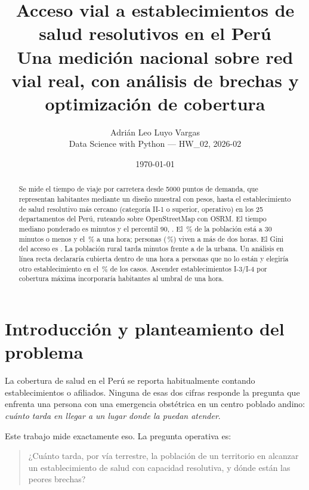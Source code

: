 \documentclass[10pt,a4paper]{article}
\title{\bfseries Acceso vial a establecimientos de salud resolutivos en el
Perú\\[0.35em]\large Una medición nacional sobre red vial real, con análisis de
brechas y optimización de cobertura}
\author{Adrián Leo Luyo Vargas\\\small Data Science with Python — HW\_02, 2026-02}
\date{\today}
\begin{document}
\maketitle

\begin{abstract}
\noindent
Se mide el tiempo de viaje por carretera desde \num{5000} puntos de demanda, que
representan \kpiPoblacionTotal{} habitantes mediante un diseño muestral con
pesos, hasta el establecimiento de salud resolutivo más cercano (categoría II-1
o superior, operativo) en los 25 departamentos del Perú, ruteando sobre
OpenStreetMap con OSRM. El tiempo mediano ponderado es \kpiTiempoMediano{}
minutos y el percentil 90, \kpiTiempoPnoventa{}. El \kpiShareHastaTresCero\,\% de la
población está a 30 minutos o menos y el \kpiShareHastaSeisCero\,\% a una hora;
\kpiPobMasUnoDosCero{} personas (\kpiShareMasUnoDosCero\,\%) viven a más de dos horas. El Gini
del acceso es \kpiGini{}. La población rural tarda \kpiTiempoMedioRural{}
minutos frente a \kpiTiempoMedioUrbano{} de la urbana. Un análisis en línea
recta declararía cubierta dentro de una hora a \kpiPobReclasificada{} personas
que no lo están y elegiría otro establecimiento en el
\kpiShareCambiaCercano\,\% de los casos. Ascender \kpiMclpPresupuesto{}
establecimientos I-3/I-4 por cobertura máxima incorporaría \kpiMclpGanancia{}
habitantes al umbral de una hora.
\end{abstract}

\section{Introducción y planteamiento del problema}

La cobertura de salud en el Perú se reporta habitualmente contando
establecimientos o afiliados. Ninguna de esas dos cifras responde la pregunta
que enfrenta una persona con una emergencia obstétrica en un centro poblado
andino: \emph{cuánto tarda en llegar a un lugar donde la puedan atender}.

Este trabajo mide exactamente eso. La pregunta operativa es:

\begin{quote}
¿Cuánto tarda, por vía terrestre, la población de un territorio en alcanzar un
establecimiento de salud con capacidad resolutiva, y dónde están las peores
brechas?
\end{quote}
\end{document}
